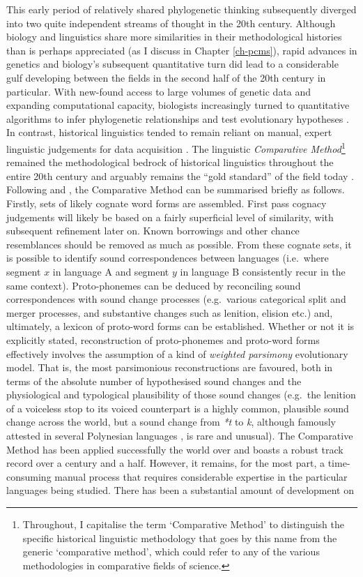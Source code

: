 This early period of relatively shared phylogenetic thinking subsequently diverged into two quite independent streams of thought in the 20th century. Although biology and linguistics share more similarities in their methodological histories than is perhaps appreciated (as I discuss in Chapter \ref{ch-pcms}), rapid advances in genetics and biology's subsequent quantitative turn did lead to a considerable gulf developing between the fields in the second half of the 20th century in particular. With new-found access to large volumes of genetic data and expanding computational capacity, biologists increasingly turned to quantitative algorithms to infer phylogenetic relationships and test evolutionary hypotheses \autocite{atkinson_curious_2005}. In contrast, historical linguistics tended to remain reliant on manual, expert linguistic judgements for data acquisition \autocite{nunn_comparative_2011}. The linguistic \emph{Comparative Method}\footnote{Throughout, I capitalise the term `Comparative Method' to distinguish the specific historical linguistic methodology that goes by this name from the generic `comparative method', which could refer to any of the various methodologies in comparative fields of science.} remained the methodological bedrock of historical linguistics throughout the entire 20th century and arguably remains the ``gold standard'' of the field today \autocite[p.~712]{dunn_structural_2008}. Following \textcite{thomason_language_1988} and \textcite{campbell_historical_2004}, the Comparative Method can be summarised briefly as follows. Firstly, sets of likely cognate word forms are assembled. First pass cognacy judgements will likely be based on a fairly superficial level of similarity, with subsequent refinement later on. Known borrowings and other chance resemblances should be removed as much as possible. From these cognate sets, it is possible to identify sound correspondences between languages (i.e.~where segment \(x\) in language A and segment \(y\) in language B consistently recur in the same context). Proto-phonemes can be deduced by reconciling sound correspondences with sound change processes (e.g.~various categorical split and merger processes, and substantive changes such as lenition, elision etc.) and, ultimately, a lexicon of proto-word forms can be established. Whether or not it is explicitly stated, reconstruction of proto-phonemes and proto-word forms effectively involves the assumption of a kind of \emph{weighted parsimony} evolutionary model. That is, the most parsimonious reconstructions are favoured, both in terms of the absolute number of hypothesised sound changes and the physiological and typological plausibility of those sound changes (e.g.~the lenition of a voiceless stop to its voiced counterpart is a highly common, plausible sound change across the world, but a sound change from \emph{*t} to \emph{k}, although famously attested in several Polynesian languages \autocite{blust_t_2004}, is rare and unusual). The Comparative Method has been applied successfully the world over and boasts a robust track record over a century and a half. However, it remains, for the most part, a time-consuming manual process that requires considerable expertise in the particular languages being studied. There has been a substantial amount of development on 